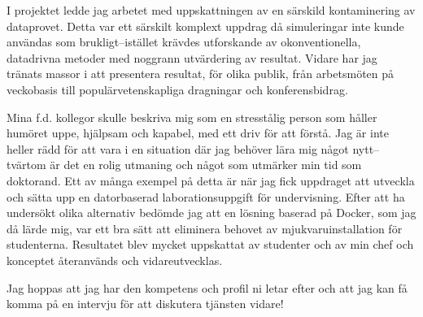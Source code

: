 \documentclass[11pt, a4paper]{../awesome-cv} %
\begin{document}
\begin{cvletter}
I projektet ledde jag arbetet med uppskattningen av en särskild kontaminering av dataprovet. %
Detta var ett särskilt komplext uppdrag då simuleringar inte kunde användas som brukligt–istället krävdes utforskande av okonventionella, datadrivna metoder med noggrann utvärdering av resultat. %
Vidare har jag tränats massor i att presentera resultat, för olika publik, från arbetsmöten på veckobasis till populärvetenskapliga dragningar och konferensbidrag.

Mina f.d. kollegor skulle beskriva mig som en stresstålig person som håller humöret uppe, hjälpsam och kapabel, med ett driv för att förstå. 
Jag är inte heller rädd för att vara i en situation där jag behöver lära mig något nytt–tvärtom är det en rolig utmaning och något som utmärker min tid som doktorand.
Ett av många exempel på detta är när jag fick uppdraget att utveckla och sätta upp en datorbaserad laborationsuppgift för undervisning.
Efter att ha undersökt olika alternativ bedömde jag att en lösning baserad på Docker, som jag då lärde mig, var ett bra sätt att eliminera behovet av mjukvaruinstallation för studenterna.
Resultatet blev mycket uppskattat av studenter och av min chef och konceptet återanvänds och vidareutvecklas.

Jag hoppas att jag har den kompetens och profil ni letar efter och att jag kan få komma på en intervju för att diskutera tjänsten vidare!


\end{cvletter}


\makeletterclosing %
\end{document}
